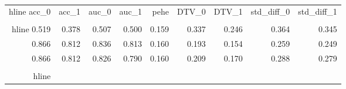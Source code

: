 \begin{table}[h]
\centering
\caption{}
\label{wd_para_2.0_wd_75.38691711425781}
\begin{tabular}{rrrrrrrrr}
\\hline
 acc\_0 &  acc\_1 &  auc\_0 &  auc\_1 &  pehe &  DTV\_0 &  DTV\_1 &  std\_diff\_0 &  std\_diff\_1 \\
\\hline
 0.519 &  0.378 &  0.507 &  0.500 & 0.159 &  0.337 &  0.246 &       0.364 &       0.345 \\
 0.866 &  0.812 &  0.836 &  0.813 & 0.160 &  0.193 &  0.154 &       0.259 &       0.249 \\
 0.866 &  0.812 &  0.826 &  0.790 & 0.160 &  0.209 &  0.170 &       0.288 &       0.279 \\
\\hline
\end{tabular}
\end{table}
